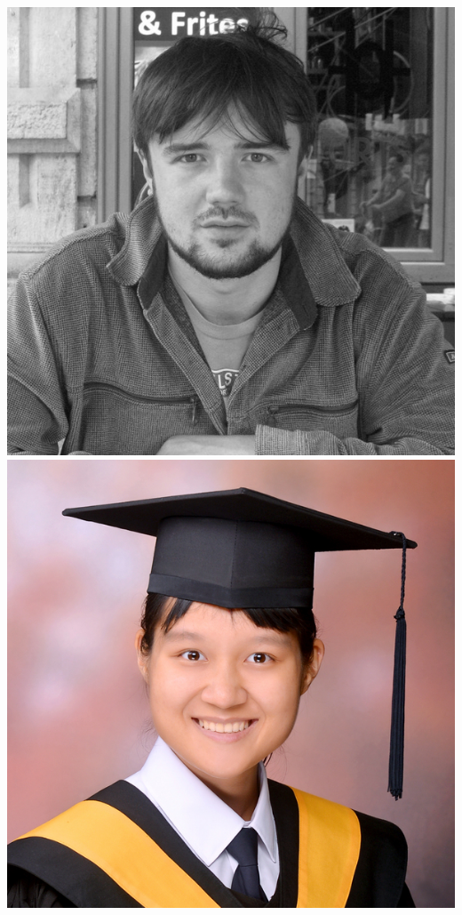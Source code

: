 \documentclass[aspectratio=169]{beamer}
\begin{document}
\begin{frame}
{        \includegraphics[width=0.10\textheight]{people/sam_leeney.jpg}%
        \includegraphics[width=0.10\textheight]{people/wei-ning_deng.jpg}%
}
\end{frame}
\end{document}
